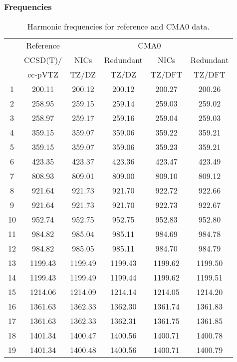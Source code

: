 \documentclass[10pt,oneside]{article}
\begin{document}
\begin{table}[h!]
\subsubsection*{Frequencies}
\centering
\caption{Harmonic frequencies for reference and CMA0 data.}
\begin{tabular}{cccccc}
\toprule
{} & Reference & \multicolumn{4}{c}{CMA0} \\
{} &  CCSD(T)/ &    NICs &  Redundant &    NICs & Redundant \\
{} &   cc-pVTZ &   TZ/DZ &      TZ/DZ &  TZ/DFT &    TZ/DFT \\
\midrule
1  &    200.11 &  200.12 &     200.12 &  200.27 &    200.26 \\
2  &    258.95 &  259.15 &     259.14 &  259.03 &    259.02 \\
3  &    258.97 &  259.17 &     259.16 &  259.04 &    259.03 \\
4  &    359.15 &  359.07 &     359.06 &  359.22 &    359.21 \\
5  &    359.15 &  359.07 &     359.06 &  359.23 &    359.21 \\
6  &    423.35 &  423.37 &     423.36 &  423.47 &    423.49 \\
7  &    808.93 &  809.01 &     809.00 &  809.10 &    809.12 \\
8  &    921.64 &  921.73 &     921.70 &  922.72 &    922.66 \\
9  &    921.64 &  921.73 &     921.70 &  922.73 &    922.67 \\
10 &    952.74 &  952.75 &     952.75 &  952.83 &    952.80 \\
11 &    984.82 &  985.04 &     985.11 &  984.69 &    984.78 \\
12 &    984.82 &  985.05 &     985.11 &  984.70 &    984.79 \\
13 &   1199.43 & 1199.49 &    1199.43 & 1199.62 &   1199.50 \\
14 &   1199.43 & 1199.49 &    1199.44 & 1199.62 &   1199.51 \\
15 &   1214.06 & 1214.09 &    1214.14 & 1214.05 &   1214.20 \\
16 &   1361.63 & 1362.33 &    1362.30 & 1361.74 &   1361.83 \\
17 &   1361.63 & 1362.33 &    1362.31 & 1361.75 &   1361.85 \\
18 &   1401.34 & 1400.47 &    1400.56 & 1400.71 &   1400.78 \\
19 &   1401.34 & 1400.48 &    1400.56 & 1400.71 &   1400.79 \\

\end{tabular}
\end{table}
\end{document}
